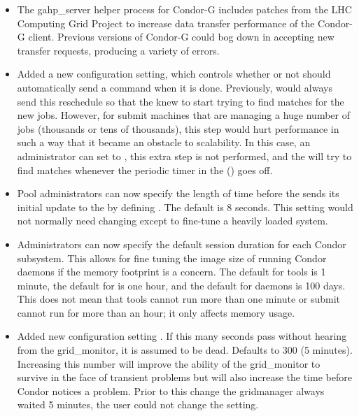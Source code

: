 \begin{itemize}
\item The gahp\_server helper process for Condor-G includes patches from
the LHC Computing Grid Project to increase data transfer performance of
the Condor-G client. Previous versions of Condor-G could bog down in
accepting new transfer requests, producing a variety of errors. 

\item Added a new configuration setting,
   which controls whether or not
   should automatically send a 
  command when it is done.
  Previously,  would always send this reschedule so
  that the  knew to start trying to find matches for
  the new jobs.
  However, for submit machines that are managing a huge number of jobs
  (thousands or tens of thousands), this step would hurt performance
  in such a way that it became an obstacle to scalability.
  In this case, an administrator can set
   to \verb@FALSE@, this extra
  step is not performed, and the  will try to find
  matches whenever the periodic timer in the 
  () goes off.

\item Pool administrators can now specify the length of time before
  the  sends its initial update to the
   by defining
  . 
  The default is 8 seconds.
  This setting would not normally need changing except to fine-tune a
  heavily loaded system.

\item Administrators can now specify the default session duration for
  each Condor subsystem.
  This allows for fine tuning the image size of running Condor daemons
  if the memory footprint is a concern.
  The default for tools is 1 minute, the default for 
  is one hour, and the default for daemons is 100 days.
  This does not mean that tools cannot run more than one minute or
  submit cannot run for more than an hour; it only affects memory
  usage.

\item Added new configuration setting
  .
  If this many
  seconds pass without hearing from the grid\_monitor, it is
  assumed to be dead.  Defaults to 300 (5 minutes).  Increasing
  this number will improve the ability of the grid\_monitor to
  survive in the face of transient problems but will also
  increase the time before Condor notices a problem.  Prior to
  this change the gridmanager always waited 5 minutes, the user
  could not change the setting.


\end{itemize}
